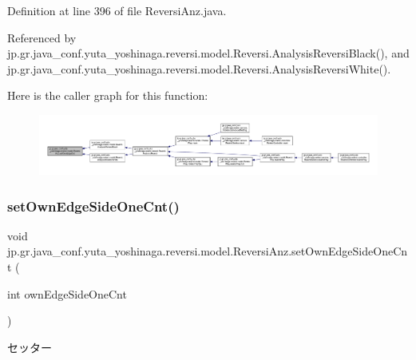 Definition at line 396 of file Reversi\+Anz.\+java.



Referenced by jp.\+gr.\+java\+\_\+conf.\+yuta\+\_\+yoshinaga.\+reversi.\+model.\+Reversi.\+Analysis\+Reversi\+Black(), and jp.\+gr.\+java\+\_\+conf.\+yuta\+\_\+yoshinaga.\+reversi.\+model.\+Reversi.\+Analysis\+Reversi\+White().

Here is the caller graph for this function\+:
\nopagebreak
\begin{figure}[H]
\begin{center}
\leavevmode
\includegraphics[width=350pt]{classjp_1_1gr_1_1java__conf_1_1yuta__yoshinaga_1_1reversi_1_1model_1_1_reversi_anz_a6003ce46230d00dee3f83489000f1942_icgraph}
\end{center}
\end{figure}
\mbox{\label{classjp_1_1gr_1_1java__conf_1_1yuta__yoshinaga_1_1reversi_1_1model_1_1_reversi_anz_a637da35cb4ecce8e7b33c1d96b483a0e}} 
\subsubsection{\texorpdfstring{set\+Own\+Edge\+Side\+One\+Cnt()}{setOwnEdgeSideOneCnt()}}
{\footnotesize\ttfamily void jp.\+gr.\+java\+\_\+conf.\+yuta\+\_\+yoshinaga.\+reversi.\+model.\+Reversi\+Anz.\+set\+Own\+Edge\+Side\+One\+Cnt (\begin{DoxyParamCaption}\item[{int}]{own\+Edge\+Side\+One\+Cnt }\end{DoxyParamCaption})}



セッター 


